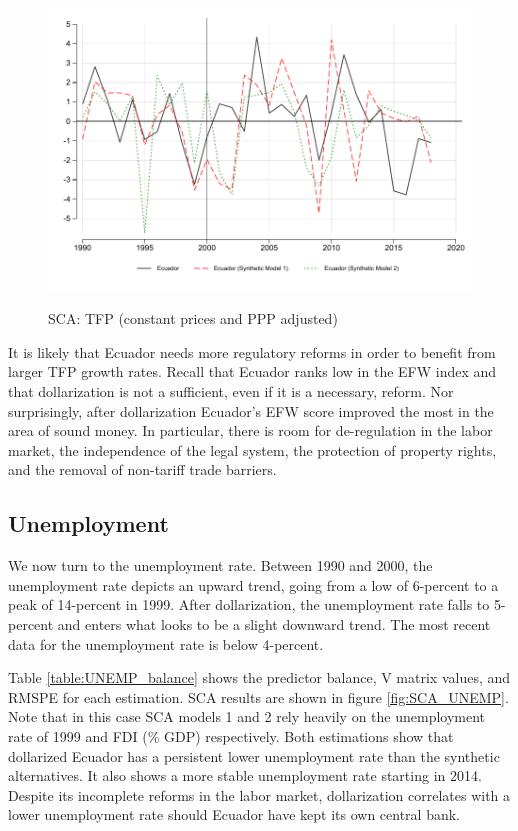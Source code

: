 \documentclass[12pt]{article}
\begin{document}
\begin{figure}[!h]
    \caption{SCA: TFP (constant prices and PPP adjusted)}
    \centering
    \includegraphics{STATA/Fig_TFP3_SCA.pdf}
    \label{fig:SCA_TFP}
\end{figure}

It is likely that Ecuador needs more regulatory reforms in order to benefit from larger TFP growth rates. Recall that Ecuador ranks low in the EFW index and that dollarization is not a sufficient, even if it is a necessary, reform. Nor surprisingly, after dollarization Ecuador's EFW score improved the most in the area of sound money. In particular, there is room for de-regulation in the labor market, the independence of the legal system, the protection of property rights, and the removal of non-tariff trade barriers.

\subsection{Unemployment}

We now turn to the unemployment rate. Between 1990 and 2000, the unemployment rate depicts an upward trend, going from a low of 6-percent to a peak of 14-percent in 1999. After dollarization, the unemployment rate falls to 5-percent and enters what looks to be a slight downward trend. The most recent data for the unemployment rate is below 4-percent. 

Table \ref{table:UNEMP_balance} shows the predictor balance, V matrix values, and RMSPE for each estimation. SCA results are shown in figure \ref{fig:SCA_UNEMP}. Note that in this case SCA models 1 and 2 rely heavily on the unemployment rate of 1999 and FDI (\% GDP) respectively. Both estimations show that dollarized Ecuador has a persistent lower unemployment rate than the synthetic alternatives. It also shows a more stable unemployment rate starting in 2014. Despite its incomplete reforms in the labor market, dollarization correlates with a lower unemployment rate should Ecuador have kept its own central bank.
\end{document}
